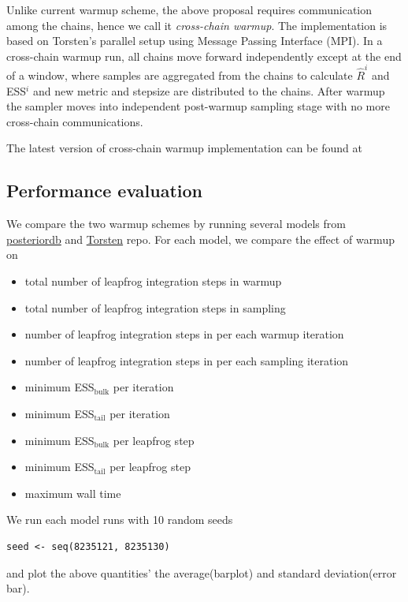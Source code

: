 \documentclass[11pt, reqno, oneside]{amsart}
\begin{document}
Unlike current warmup scheme, the above proposal requires
communication among the chains, hence we call it \emph{cross-chain warmup}.
The implementation is based on Torsten's parallel setup using Message
Passing Interface (MPI). In
a cross-chain warmup run, all chains move forward independently except
at the end of a window, where samples are aggregated from the chains
to calculate \(\hat{R}^i\) and ESS\(^i\) and new metric and stepsize are
distributed to the chains.
After warmup the sampler moves into independent post-warmup sampling stage
with no more cross-chain communications.

The latest version of cross-chain warmup implementation can be found
at

\subsection{Performance evaluation}
\label{sec:orgeefee9a}
We compare the two warmup schemes by running several models
from \href{https://github.com/MansMeg/posteriordb}{posteriordb} and \href{https://github.com/metrumresearchgroup/Torsten/tree/master/example-models}{Torsten} repo. For each model, we compare the
effect of warmup on 
\begin{itemize}
\item total number of leapfrog integration steps in warmup
\item total number of leapfrog integration steps in sampling
\item number of leapfrog integration steps in per each warmup iteration
\item number of leapfrog integration steps in per each sampling iteration
\item minimum ESS\(_{\text{bulk}}\) per iteration
\item minimum ESS\(_{\text{tail}}\) per iteration
\item minimum ESS\(_{\text{bulk}}\) per leapfrog step
\item minimum ESS\(_{\text{tail}}\) per leapfrog step
\item maximum wall time
\end{itemize}

We run each model runs with 10 random seeds 
\begin{verbatim}
seed <- seq(8235121, 8235130)
\end{verbatim}
and plot the above
quantities' the average(barplot)
and standard deviation(error bar).
\end{document}
